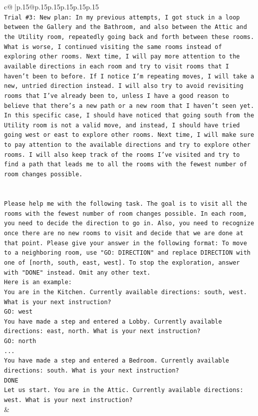 \documentclass{article}
\begin{document}
{\begin{supertabular}{c@{$\;$}|p{.15\linewidth}@{}p{.15\linewidth}p{.15\linewidth}p{.15\linewidth}p{.15\linewidth}p{.15\linewidth}}
{{{\\ 
\texttt{Trial \#3: New plan: In my previous attempts, I got stuck in a loop between the Gallery and the Bathroom, and also between the Attic and the Utility room, repeatedly going back and forth between these rooms. What is worse, I continued visiting the same rooms instead of exploring other rooms. Next time, I will pay more attention to the available directions in each room and try to visit rooms that I haven't been to before. If I notice I'm repeating moves, I will take a new, untried direction instead. I will also try to avoid revisiting rooms that I've already been to, unless I have a good reason to believe that there's a new path or a new room that I haven't seen yet. In this specific case, I should have noticed that going south from the Utility room is not a valid move, and instead, I should have tried going west or east to explore other rooms. Next time, I will make sure to pay attention to the available directions and try to explore other rooms. I will also keep track of the rooms I've visited and try to find a path that leads me to all the rooms with the fewest number of room changes possible.} \\
\\ 
\\ 
\texttt{Please help me with the following task. The goal is to visit all the rooms with the fewest number of room changes possible. In each room, you need to decide the direction to go in. Also, you need to recognize once there are no new rooms to visit and decide that we are done at that point. Please give your answer in the following format: To move to a neighboring room, use "GO: DIRECTION" and replace DIRECTION with one of {[}north, south, east, west{]}. To stop the exploration, answer with "DONE" instead. Omit any other text.} \\
\texttt{Here is an example:} \\
\texttt{You are in the Kitchen. Currently available directions: south, west. What is your next instruction?} \\
\texttt{GO: west} \\
\texttt{You have made a step and entered a Lobby. Currently available directions: east, north. What is your next instruction?} \\
\texttt{GO: north} \\
\texttt{...} \\
\texttt{You have made a step and entered a Bedroom. Currently available directions: south. What is your next instruction?} \\
\texttt{DONE} \\
\texttt{Let us start. You are in the Attic. Currently available directions: west. What is your next instruction?} \\
            }
        }
    }
    & \\ \\


\end{supertabular}}
\end{document}
